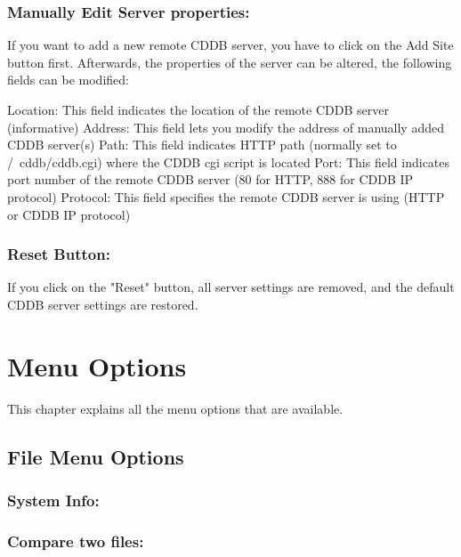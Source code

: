 \subsection{Manually Edit Server properties:}
If you want to add a new remote CDDB server, you have to click on the Add Site button first.
Afterwards, the properties of the server can be altered, the following fields can be modified:

Location: This field indicates the location of the remote CDDB server (informative)
Address: This field lets you modify the address of manually added CDDB server(s)
Path: This field indicates HTTP path (normally set to /~cddb/cddb.cgi) where the CDDB cgi script is located
Port: This field indicates port number of the remote CDDB server (80 for HTTP, 888 for CDDB IP protocol)
Protocol: This field specifies the remote CDDB server is using (HTTP or CDDB IP protocol)

\subsection{Reset Button:}
If you click on the "Reset" button, all server settings are removed, and the default CDDB server settings are
restored.

\chapter{Menu Options}
\setfooter{\thepage}{}{}{}{}{\thepage}

This chapter explains all the menu options that are available.

\section{File Menu Options}


\subsection{System Info:}


\subsection{Compare two files:}

